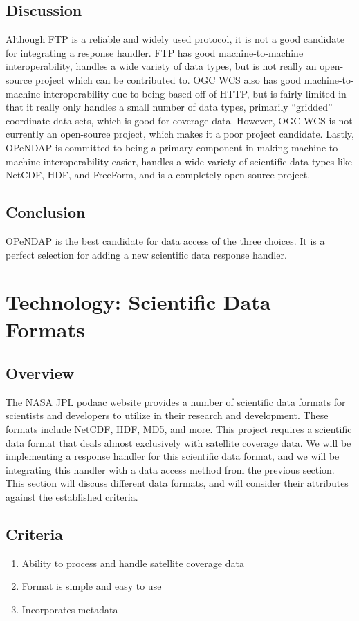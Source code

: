 \documentclass[onecolumn, draftclsnofoot,10pt, compsoc]{IEEEtran}
\begin{document}
\subsection{Discussion}
Although FTP is a reliable and widely used protocol, it is not a good candidate for integrating a response handler. FTP has good machine-to-machine interoperability, handles a wide variety of data types, but is not really an open-source project which can be contributed to. OGC WCS also has good machine-to-machine interoperability due to being based off of HTTP, but is fairly limited in that it really only handles a small number of data types, primarily “gridded” coordinate data sets, which is good for coverage data. However, OGC WCS is not currently an open-source project, which makes it a poor project candidate. Lastly, OPeNDAP is committed to being a primary component in making machine-to-machine interoperability easier, handles a wide variety of scientific data types like NetCDF, HDF, and FreeForm, and is a completely open-source project.

\subsection{Conclusion}
OPeNDAP is the best candidate for data access of the three choices. It is a perfect selection for adding a new scientific data response handler.

\section{Technology: Scientific Data Formats}

\subsection{Overview}
The NASA JPL podaac website provides a number of scientific data formats for scientists and developers to utilize in their research and development. These formats include NetCDF, HDF, MD5, and more. This project requires a scientific data format that deals almost exclusively with satellite coverage data. We will be implementing a response handler for this scientific data format, and we will be integrating this handler with a data access method from the previous section. This section will discuss different data formats, and will consider their attributes against the established criteria.

\subsection{Criteria}
\begin{enumerate}
\item Ability to process and handle satellite coverage data
\item Format is simple and easy to use
\item Incorporates metadata
\end{enumerate}
\end{document}
